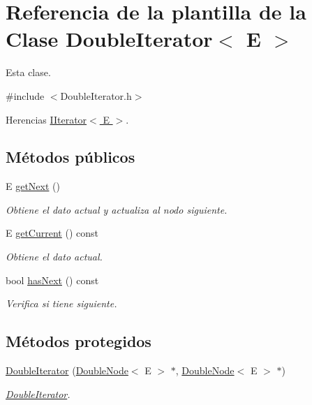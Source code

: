 \hypertarget{classDoubleIterator}{\section{Referencia de la plantilla de la Clase Double\-Iterator$<$ E $>$}
\label{classDoubleIterator}
}


Esta clase.  




{\ttfamily \#include $<$Double\-Iterator.\-h$>$}



Herencias \hyperlink{classIIterator}{I\-Iterator$<$ E $>$}.

\subsection*{Métodos públicos}
\begin{DoxyCompactItemize}
\item 
E \hyperlink{classDoubleIterator_aaaa1b361a61339bfee3bf86f3f67b198}{get\-Next} ()
\begin{DoxyCompactList}\small\item\em Obtiene el dato actual y actualiza al nodo siguiente. \end{DoxyCompactList}\item 
E \hyperlink{classDoubleIterator_a756bb08f5352e270e08b72339c32e2be}{get\-Current} () const 
\begin{DoxyCompactList}\small\item\em Obtiene el dato actual. \end{DoxyCompactList}\item 
bool \hyperlink{classDoubleIterator_adb5ef4c66649e0a4ce18e38cd85904ed}{has\-Next} () const 
\begin{DoxyCompactList}\small\item\em Verifica si tiene siguiente. \end{DoxyCompactList}\end{DoxyCompactItemize}
\subsection*{Métodos protegidos}
\begin{DoxyCompactItemize}
\item 
\hypertarget{classDoubleIterator_a5b45a91dc363462fddcb4965e226e2fc}{\hyperlink{classDoubleIterator_a5b45a91dc363462fddcb4965e226e2fc}{Double\-Iterator} (\hyperlink{classDoubleNode}{Double\-Node}$<$ E $>$ $\ast$, \hyperlink{classDoubleNode}{Double\-Node}$<$ E $>$ $\ast$)}\label{classDoubleIterator_a5b45a91dc363462fddcb4965e226e2fc}

\begin{DoxyCompactList}\small\item\em \hyperlink{classDoubleIterator}{Double\-Iterator}. \end{DoxyCompactList}\end{DoxyCompactItemize}
